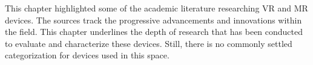 This chapter highlighted some of the academic literature researching VR and MR devices. The sources track the progressive advancements and innovations within the field. This chapter underlines the depth of research that has been conducted to evaluate and characterize these devices. Still, there is no commonly settled categorization for devices used in this space.